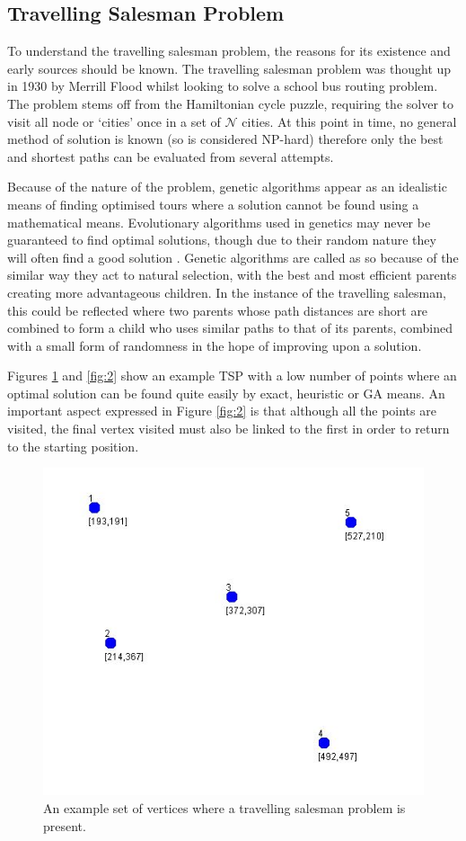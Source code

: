 \documentclass[article]{IEEEtran}
\begin{document}
\subsection{Travelling Salesman Problem}
To understand the travelling salesman problem, the reasons for its existence and early sources should be known. The travelling salesman problem was thought up in 1930 \cite{1} by Merrill Flood whilst looking to solve a school bus routing problem. The problem stems off from the Hamiltonian cycle puzzle, requiring the solver to visit all node or ‘cities’ once in a set of \( \mathcal{N} \) cities. At this point in time, no general method of solution is known \cite{2} (so is considered NP-hard) therefore only the best and shortest paths can be evaluated from several attempts. \par
Because of the nature of the problem, genetic algorithms appear as an idealistic means of finding optimised tours where a solution cannot be found using a mathematical means. Evolutionary algorithms used in genetics may never be guaranteed to find optimal solutions, though due to their random nature they will often find a good solution \cite{3}. Genetic algorithms are called as so because of the similar way they act to natural selection, with the best and most efficient parents creating more advantageous children. In the instance of the travelling salesman, this could be reflected where two parents whose path distances are short are combined to form a child who uses similar paths to that of its parents, combined with a small form of randomness in the hope of improving upon a solution. \par
Figures \ref{fig:1} and \ref{fig:2} show an example TSP with a low number of points where an optimal solution can be found quite easily by exact, heuristic or GA means. An important aspect expressed in Figure \ref{fig:2} is that although all the points are visited, the final vertex visited must also be linked to the first in order to return to the starting position.
\begin{figure}
\centering
\includegraphics[width=.8\linewidth]{images/problem}
\caption{An example set of vertices where a travelling salesman problem is present.}
\label{fig:1}
\end{figure}
\end{document}

